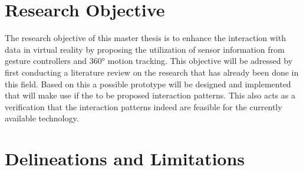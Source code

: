 
\section{Research Objective}

The research objective of this master thesis is to enhance the interaction with data in virtual reality by proposing the utilization of sensor information from gesture controllers and 360° motion tracking.\newline
This objective will be adressed by first conducting a literature review on the research that has already been done in this field. Based on this a possible prototype will be designed and implemented that will make use if the to be proposed interaction patterns. This also acts as a verification that the interaction patterns indeed are feasible for the currently available technology.






\section{Delineations and Limitations}


